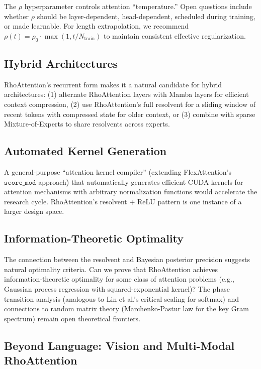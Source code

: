 \documentclass[11pt,a4paper]{article}
\theoremstyle{remark}
\begin{document}
The $\rho$ hyperparameter controls attention ``temperature.'' Open questions include whether $\rho$ should be layer-dependent, head-dependent, scheduled during training, or made learnable. For length extrapolation, we recommend $\rho(t) = \rho_0 \cdot \max(1, t / N_{\text{train}})$ to maintain consistent effective regularization.

\subsection{Hybrid Architectures}

RhoAttention's recurrent form makes it a natural candidate for hybrid architectures: (1) alternate RhoAttention layers with Mamba layers for efficient context compression, (2) use RhoAttention's full resolvent for a sliding window of recent tokens with compressed state for older context, or (3) combine with sparse Mixture-of-Experts to share resolvents across experts.

\subsection{Automated Kernel Generation}

A general-purpose ``attention kernel compiler'' (extending FlexAttention's $\texttt{score\_mod}$ approach) that automatically generates efficient CUDA kernels for attention mechanisms with arbitrary normalization functions would accelerate the research cycle. RhoAttention's resolvent + ReLU pattern is one instance of a larger design space.

\subsection{Information-Theoretic Optimality}

The connection between the resolvent and Bayesian posterior precision suggests natural optimality criteria. Can we prove that RhoAttention achieves information-theoretic optimality for some class of attention problems (e.g., Gaussian process regression with squared-exponential kernel)? The phase transition analysis (analogous to Lin et al.'s critical scaling for softmax) and connections to random matrix theory (Marchenko-Pastur law for the key Gram spectrum) remain open theoretical frontiers.

\subsection{Beyond Language: Vision and Multi-Modal RhoAttention}
\end{document}
